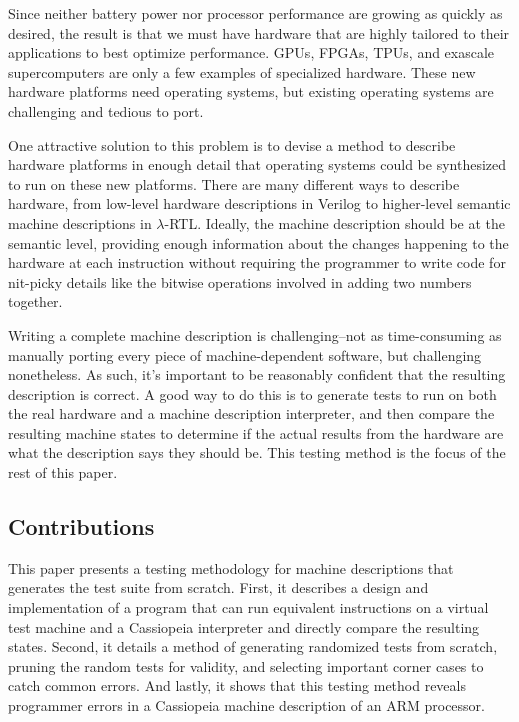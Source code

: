 \documentclass[letterpaper,12pt]{article}
\begin{document}
Since neither battery power nor processor performance are growing as quickly as desired, the result is that we must have hardware that are highly tailored to their applications to best optimize performance. GPUs, FPGAs, TPUs, and exascale supercomputers are only a few examples of specialized hardware. These new hardware platforms need operating systems, but existing operating systems are challenging and tedious to port.

One attractive solution to this problem is to devise a method to describe hardware platforms in enough detail that operating systems could be synthesized to run on these new platforms. There are many different ways to describe hardware, from low-level hardware descriptions in Verilog to higher-level semantic machine descriptions in $\lambda$-RTL. Ideally, the machine description should be at the semantic level, providing enough information about the changes happening to the hardware at each instruction without requiring the programmer to write code for nit-picky details like the bitwise operations involved in adding two numbers together.

Writing a complete machine description is challenging--not as time-consuming as manually porting every piece of machine-dependent software, but challenging nonetheless. As such, it's important to be reasonably confident that the resulting description is correct. A good way to do this is to generate tests to run on both the real hardware and a machine description interpreter, and then compare the resulting machine states to determine if the actual results from the hardware are what the description says they should be. This testing method is the focus of the rest of this paper.

\subsection{Contributions}

This paper presents a testing methodology for machine descriptions that generates the test suite from scratch. First, it describes a design and implementation of a program that can run equivalent instructions on a virtual test machine and a Cassiopeia interpreter and directly compare the resulting states. Second, it details a method of generating randomized tests from scratch, pruning the random tests for validity, and selecting important corner cases to catch common errors. And lastly, it shows that this testing method reveals programmer errors in a Cassiopeia machine description of an ARM processor.
\end{document}
